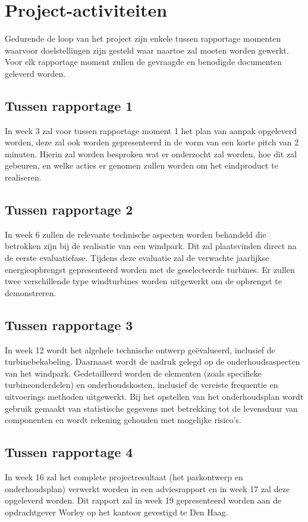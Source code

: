 \section{Project-activiteiten}
Gedurende de loop van het project zijn enkele tussen rapportage momenten waarvoor doelstellingen zijn gesteld waar naartoe zal moeten worden gewerkt. Voor elk rapportage moment zullen de gevraagde en benodigde documenten geleverd worden.

\subsection{Tussen rapportage 1}
In week 3 zal voor tussen rapportage moment 1 het plan van aanpak opgeleverd worden, deze zal ook worden gepresenteerd in de vorm van een korte pitch van 2 minuten. Hierin zal worden besproken wat er onderzocht zal worden, hoe dit zal gebeuren, en welke acties er genomen zullen worden om het eindproduct te realiseren.

\subsection{Tussen rapportage 2}
In week 6 zullen de relevante technische aspecten worden behandeld die betrokken zijn bij de realisatie van een windpark. Dit zal plaatsvinden direct na de eerste evaluatiefase. Tijdens deze evaluatie zal de verwachte jaarlijkse energieopbrengst gepresenteerd worden met de geselecteerde turbines. Er zullen twee verschillende type windturbines worden uitgewerkt om de opbrengst te demonstreren.

\subsection{Tussen rapportage 3}
In week 12 wordt het algehele technische ontwerp geëvalueerd, inclusief de turbinebekabeling. Daarnaast wordt de nadruk gelegd op de onderhoudsaspecten van het windpark. Gedetailleerd worden de elementen (zoals specifieke turbineonderdelen) en onderhoudskosten, inclusief de vereiste frequentie en uitvoerings methoden uitgewerkt. Bij het opstellen van het onderhoudsplan wordt gebruik gemaakt van statistische gegevens met betrekking tot de levensduur van componenten en wordt rekening gehouden met mogelijke risico's\cite{algemene-kosten-windpark}.

\subsection{Tussen rapportage 4}
In week 16 zal het complete projectresultaat (het parkontwerp en onderhoudsplan) verwerkt worden in een adviesrapport en in week 17 zal deze opgeleverd worden. Dit rapport zal in week 19 gepresenteerd worden aan de opdrachtgever Worley op het kantoor gevestigd te Den Haag.